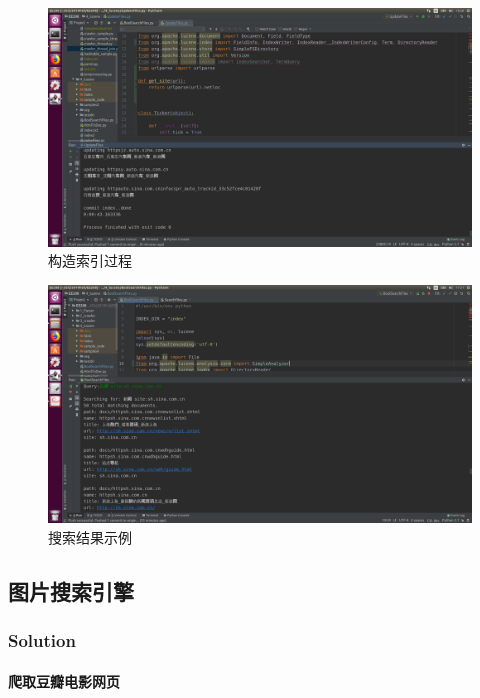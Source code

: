 \documentclass{article}
\begin{document}
\begin{figure}[htbp]
\centering
\includegraphics[width=14.5cm]{img/siteupdate.png}
\caption{构造索引过程}
\label{fig:siteindex}
\end{figure}


\begin{figure}[htbp]
\centering
\includegraphics[width=14.5cm]{img/sitesearch2.png}
\caption{搜索结果示例}
\label{fig:sitetest}
\end{figure}




\subsection{图片搜索引擎}

\subsubsection{Solution}

\paragraph{爬取豆瓣电影网页}
\end{document}

